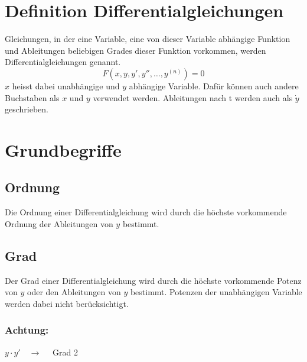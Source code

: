



\section{Definition Differentialgleichungen}
Gleichungen, in der eine Variable, eine von dieser Variable abhängige Funktion 
und Ableitungen beliebigen Grades dieser Funktion vorkommen, werden 
Differentialgleichungen genannt. 
\[ F(x, y, y', y'', \ldots, y^{(n)})=0 \]
$x$ heisst dabei unabhängige und $y$ abhängige Variable. Dafür können auch 
andere Buchstaben als $x$ und $y$ verwendet werden. 
Ableitungen nach t werden auch als $\dot{y}$ geschrieben. 

\section{Grundbegriffe}

\subsection{Ordnung}
Die Ordnung einer Differentialgleichung wird durch die höchste vorkommende 
Ordnung der Ableitungen von $y$ bestimmt. 

\subsection{Grad}
Der Grad einer Differentialgleichung wird durch die höchste vorkommende Potenz 
von $y$ oder den Ableitungen von $y$ bestimmt. Potenzen der unabhängigen 
Variable werden dabei nicht berücksichtigt. 
\subsubsection*{Achtung:}
$y \cdot y' \quad \rightarrow \quad$ Grad 2

